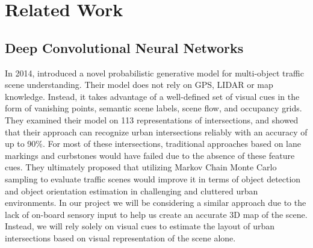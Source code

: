 \chapter{Related Work}
\label{ch:Literature}


\section{Deep Convolutional Neural Networks}
In 2014, \cite{3D-Traffic-Scene-Understanding-From-Movable-Platforms} introduced a novel probabilistic generative model for multi-object traffic scene understanding. Their model does not rely on GPS, LIDAR or map knowledge. Instead, it takes advantage of a well-defined set of visual cues in the form of vanishing points, semantic scene labels, scene flow, and occupancy grids. They examined their model on 113 representations of intersections, and showed that their approach can recognize urban intersections reliably with an accuracy of up to 90\%. For most of these intersections, traditional approaches based on lane markings and curbstones would have failed due to the absence of these feature cues. They ultimately proposed that utilizing Markov Chain Monte Carlo sampling to evaluate traffic scenes would improve it in terms of object detection and object orientation estimation in challenging and cluttered urban environments. In our project we will be considering a similar approach due to the lack of on-board sensory input to help us create an accurate 3D map of the scene. Instead, we will rely solely on visual cues to estimate the layout of urban intersections based on visual representation of the scene alone.
\par \bigskip 

